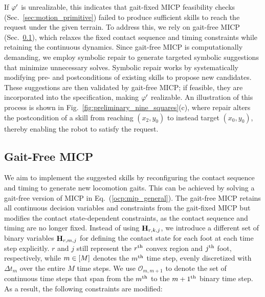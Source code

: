 If $\varphi'$ is unrealizable, this indicates that gait-fixed MICP feasibility checks (Sec.~\ref{sec:motion_primitive}) failed to produce sufficient skills to reach the request under the given terrain. To address this, we rely on gait-free MICP (Sec.~\ref{sec:gait_free_micp}), which relaxes the fixed contact sequence and timing constraints while retaining the continuous dynamics. Since gait-free MICP is computationally demanding, we employ symbolic repair \citep{pacheck2022physically} to generate targeted symbolic suggestions that minimize unnecessary solves. Symbolic repair works by systematically modifying pre- and postconditions of existing skills to propose new candidates. These suggestions are then validated by gait-free MICP; if feasible, they are incorporated into the specification, making $\varphi'$ realizable. An illustration of this process is shown in Fig.~\ref{fig:preliminary_nine_squares}(c), where repair alters the postcondition of a skill from reaching $(x_2, y_0)$ to instead target $(x_0, y_0)$, thereby enabling the robot to satisfy the request.
\subsection{Gait-Free MICP}\label{sec:gait_free_micp}
We aim to implement the suggested skills by reconfiguring the contact sequence and timing to generate new locomotion gaits. This can be achieved by solving a gait-free version of MICP in Eq.~(\ref{ocp:mip_general}). The gait-free MICP retains all continuous decision variables and constraints from the gait-fixed MICP but modifies the contact state-dependent constraints, as the contact sequence and timing are no longer fixed. Instead of using $\mathbf{H}_{r,k,j}$, we introduce a different set of binary variables $\mathbf{H}_{r,m,j}$ for defining the contact state for each foot at each time step explicitly. $r$ and $j$ still represent the $r^{\rm th}$ convex region and $j^{\rm th}$ foot, respectively, while $m \in [M]$ denotes the $m^{\rm th}$ time step, evenly discretized with $\Delta t_m$ over the entire $M$ time steps. We use $\mathcal{O}_{m,m+1}$ to denote the set of continuous time steps that span from the $m^{\rm th}$ to the ${m+1}^{\rm th}$ binary time step. As a result, the following constraints are modified:
